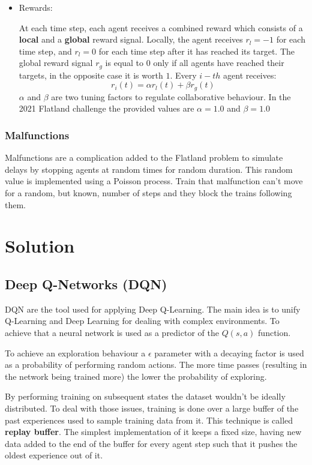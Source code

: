 \documentclass[12pt]{article}
\begin{document}
\begin{itemize}
    \item Rewards:
    
    At each time step, each agent receives a combined reward which consists of a \textbf{local} and a \textbf{global} reward signal.
    Locally, the agent receives $r_l=-1$ for each time step, and $r_l=0$ for each time step after it has reached its target.  The global reward signal $r_g$ is equal to $0$ only if all agents have reached their targets, in the opposite case it is worth $1$.
    Every $i-th$ agent receives:
    \[ r_i(t)= \alpha r_l(t) + \beta r_g(t) \]
    $\alpha$ and $\beta$ are two tuning factors to regulate collaborative behaviour. In the 2021 Flatland challenge the provided values are $\alpha = 1.0$ and $\beta = 1.0$
\end{itemize}

\subsubsection{Malfunctions}

Malfunctions are a complication added to the Flatland problem to simulate delays by stopping agents at random times for random duration. 
This random value is implemented using a Poisson process. 
Train that malfunction can’t move for a random, but known, number of steps and they block the trains following them.

\section{Solution}

\subsection{Deep Q-Networks (DQN)}

DQN \cite{atari} are the tool used for applying Deep Q-Learning. The main idea is to unify Q-Learning and Deep Learning for dealing with complex environments. 
To achieve that a neural network is used as a predictor of the $Q(s, a)$ function.

To achieve an exploration behaviour a $\epsilon$ parameter with a decaying factor is used as a probability of performing random actions. The more time passes (resulting in the network being trained more) the lower the probability of exploring.

By performing training on subsequent states the dataset wouldn't be ideally distributed. To deal with those issues, training is done over a large buffer of the past experiences used to sample training data from it. This technique is called \textbf{replay buffer}. The simplest implementation of it keeps a fixed size, having new data added to the end of the buffer for every agent step such that it pushes the oldest experience out of it. 
\end{document}
